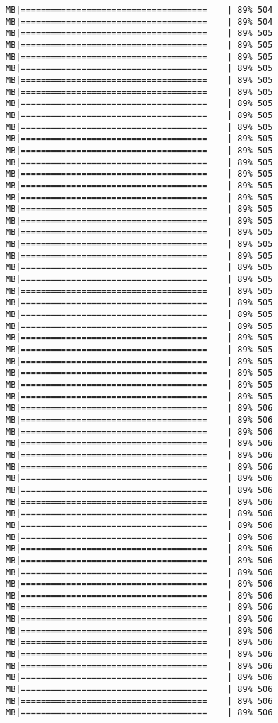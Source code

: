 \documentclass[
]{article}
\begin{document}
\begin{verbatim}
MB|=====================================    | 89% 504 MB|=====================================    | 89% 504 MB|=====================================    | 89% 505 MB|=====================================    | 89% 505 MB|=====================================    | 89% 505 MB|=====================================    | 89% 505 MB|=====================================    | 89% 505 MB|=====================================    | 89% 505 MB|=====================================    | 89% 505 MB|=====================================    | 89% 505 MB|=====================================    | 89% 505 MB|=====================================    | 89% 505 MB|=====================================    | 89% 505 MB|=====================================    | 89% 505 MB|=====================================    | 89% 505 MB|=====================================    | 89% 505 MB|=====================================    | 89% 505 MB|=====================================    | 89% 505 MB|=====================================    | 89% 505 MB|=====================================    | 89% 505 MB|=====================================    | 89% 505 MB|=====================================    | 89% 505 MB|=====================================    | 89% 505 MB|=====================================    | 89% 505 MB|=====================================    | 89% 505 MB|=====================================    | 89% 505 MB|=====================================    | 89% 505 MB|=====================================    | 89% 505 MB|=====================================    | 89% 505 MB|=====================================    | 89% 505 MB|=====================================    | 89% 505 MB|=====================================    | 89% 505 MB|=====================================    | 89% 505 MB|=====================================    | 89% 505 MB|=====================================    | 89% 506 MB|=====================================    | 89% 506 MB|=====================================    | 89% 506 MB|=====================================    | 89% 506 MB|=====================================    | 89% 506 MB|=====================================    | 89% 506 MB|=====================================    | 89% 506 MB|=====================================    | 89% 506 MB|=====================================    | 89% 506 MB|=====================================    | 89% 506 MB|=====================================    | 89% 506 MB|=====================================    | 89% 506 MB|=====================================    | 89% 506 MB|=====================================    | 89% 506 MB|=====================================    | 89% 506 MB|=====================================    | 89% 506 MB|=====================================    | 89% 506 MB|=====================================    | 89% 506 MB|=====================================    | 89% 506 MB|=====================================    | 89% 506 MB|=====================================    | 89% 506 MB|=====================================    | 89% 506 MB|=====================================    | 89% 506 MB|=====================================    | 89% 506 MB|=====================================    | 89% 506 MB|=====================================    | 89% 506 MB|=====================================    | 89% 506 
\end{verbatim}
\end{document}
